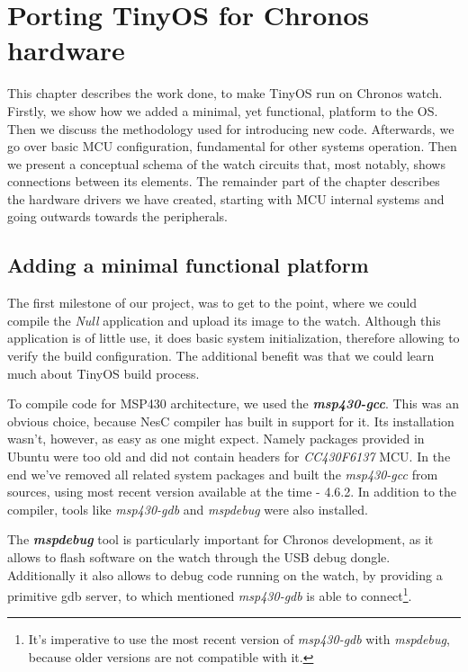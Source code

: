 \chapter{Porting TinyOS for Chronos hardware}

This chapter describes the work done, to make TinyOS run on Chronos watch. Firstly, we show how we added a minimal, yet functional, platform to the OS. Then we discuss the methodology used for introducing new code. Afterwards, we go over basic MCU configuration, fundamental for other systems operation. Then we present a conceptual schema of the watch circuits that, most notably, shows connections between its elements. The remainder part of the chapter describes the hardware drivers we have created, starting with MCU internal systems and going outwards towards the peripherals.

\section{Adding a minimal functional platform}

The first milestone of our project, was to get to the point, where we could compile the \emph{Null} application and upload its image to the watch. Although this application is of little use, it does basic system initialization, therefore allowing to verify the build configuration. The additional benefit was that we could learn much about TinyOS build process.

To compile code for MSP430 architecture, we used the \emph{\bf msp430-gcc}. This was an obvious choice, because NesC compiler has built in support for it. Its installation wasn't, however, as easy as one might expect. Namely packages provided in Ubuntu were too old and did not contain headers for \emph{CC430F6137} MCU. In the end we've removed all related system packages and built the \emph{msp430-gcc} from sources, using most recent version available at the time - 4.6.2.  In addition to the compiler, tools like \emph{msp430-gdb} and \emph{mspdebug} were also installed.

The \emph{\bf mspdebug} tool is particularly important for Chronos development, as it allows to flash software on the watch through the USB debug dongle.  Additionally it also allows to debug code running on the watch, by providing a primitive gdb server, to which mentioned \emph{msp430-gdb} is able to connect\footnote{It's imperative to use the most recent version of \emph{msp430-gdb} with \emph{mspdebug}, because older versions are not compatible with it.}.

